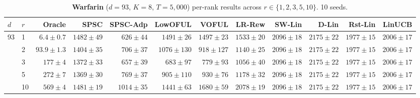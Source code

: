 \begin{table}[!htbp]
\centering
\caption{\textbf{Warfarin} ($d{=}93$, $K{=}8$, $T{=}5{,}000$) per-rank results across $r\in\{1,2,3,5,10\}$. 10 seeds.}
\label{tab:app-warfarin}
\scriptsize
\setlength{\tabcolsep}{3pt}
\begin{tabular}{llrrrrrrrrrr}
\toprule
$d$ & $r$ & Oracle & \textbf{SPSC} & \textbf{SPSC-Adp} & LowOFUL & VOFUL & LR-Rew & SW-Lin & D-Lin & Rst-Lin & LinUCB \\
\midrule
93 & 1 & $6.4{\pm}0.7$ & \cellcolor{green!12}$1482{\pm}49$ & \cellcolor{green!12}$626{\pm}44$ & \underline{$1491{\pm}26$} & $1497{\pm}23$ & $1533{\pm}20$ & $2096{\pm}18$ & $2175{\pm}22$ & $1977{\pm}15$ & $2006{\pm}17$ \\
 & 2 & $93.9{\pm}1.3$ & $1404{\pm}35$ & \cellcolor{green!12}$706{\pm}37$ & $1076{\pm}130$ & \underline{$918{\pm}127$} & $1140{\pm}25$ & $2096{\pm}18$ & $2175{\pm}22$ & $1977{\pm}15$ & $2006{\pm}17$ \\
 & 3 & $177{\pm}4$ & $1372{\pm}33$ & \cellcolor{green!12}$657{\pm}39$ & \underline{$683{\pm}97$} & $779{\pm}93$ & $1056{\pm}40$ & $2096{\pm}18$ & $2175{\pm}22$ & $1977{\pm}15$ & $2006{\pm}17$ \\
 & 5 & $272{\pm}7$ & $1369{\pm}30$ & \cellcolor{green!12}$769{\pm}37$ & \underline{$905{\pm}110$} & $930{\pm}76$ & $1178{\pm}32$ & $2096{\pm}18$ & $2175{\pm}22$ & $1977{\pm}15$ & $2006{\pm}17$ \\
 & 10 & $569{\pm}4$ & $1481{\pm}19$ & \cellcolor{green!12}$1014{\pm}35$ & \underline{$1441{\pm}63$} & $1680{\pm}59$ & $2078{\pm}19$ & $2096{\pm}18$ & $2175{\pm}22$ & $1977{\pm}15$ & $2006{\pm}17$ \\
\bottomrule
\end{tabular}
\end{table}